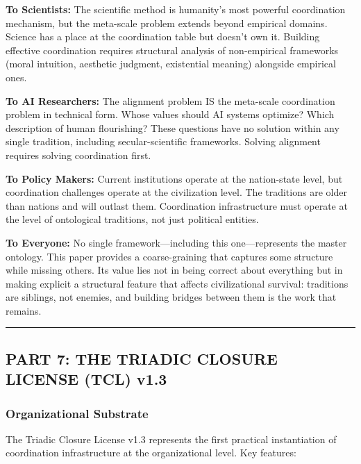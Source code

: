 \documentclass[
]{article}
\begin{document}
\textbf{To Scientists:} The scientific method is humanity's most
powerful coordination mechanism, but the meta-scale problem extends
beyond empirical domains. Science has a place at the coordination table
but doesn't own it. Building effective coordination requires structural
analysis of non-empirical frameworks (moral intuition, aesthetic
judgment, existential meaning) alongside empirical ones.

\textbf{To AI Researchers:} The alignment problem IS the meta-scale
coordination problem in technical form. Whose values should AI systems
optimize? Which description of human flourishing? These questions have
no solution within any single tradition, including secular-scientific
frameworks. Solving alignment requires solving coordination first.

\textbf{To Policy Makers:} Current institutions operate at the
nation-state level, but coordination challenges operate at the
civilization level. The traditions are older than nations and will
outlast them. Coordination infrastructure must operate at the level of
ontological traditions, not just political entities.

\textbf{To Everyone:} No single framework---including this
one---represents the master ontology. This paper provides a
coarse-graining that captures some structure while missing others. Its
value lies not in being correct about everything but in making explicit
a structural feature that affects civilizational survival: traditions
are siblings, not enemies, and building bridges between them is the work
that remains.

\begin{center}\rule{0.5\linewidth}{0.5pt}\end{center}

\subsection{PART 7: THE TRIADIC CLOSURE LICENSE (TCL)
v1.3}\label{part-7-the-triadic-closure-license-tcl-v1.3}

\subsubsection{Organizational Substrate}\label{organizational-substrate}

The Triadic Closure License v1.3 represents the first practical
instantiation of coordination infrastructure at the organizational
level. Key features:
\end{document}
